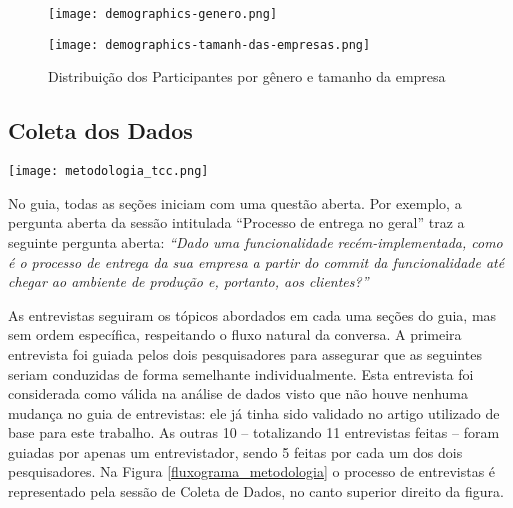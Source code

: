\begin{figure}
\begin{minipage}{.21\textwidth}
    \centering
    \texttt{[image: demographics-genero.png]}
\end{minipage}%
\begin{minipage}{.25\textwidth}
    \centering
    \texttt{[image: demographics-tamanh-das-empresas.png]}
\end{minipage}
\caption{
    Distribuição dos Participantes por gênero e tamanho da empresa
    }
    \label{genero_e_tamanho}
\end{figure}


\subsection{Coleta dos Dados}

\begin{figure*}[ht]
\begin{center}
\texttt{[image: metodologia\_tcc.png]}
\end{center}
\caption[Fluxograma da Metodologia]{
    Visão geral dos processos de coleta e análise de dados.
}\label{fluxograma_metodologia}
\end{figure*}

No guia, todas as seções iniciam com uma questão aberta. Por exemplo, a pergunta aberta da sessão intitulada ``Processo de entrega no geral'' traz a seguinte pergunta aberta: \emph{``Dado uma funcionalidade recém-implementada, como é o processo de entrega da sua empresa a partir do \emph{commit} da funcionalidade até chegar ao ambiente de produção e, portanto, aos clientes?''} 

As entrevistas seguiram os tópicos abordados em cada uma seções do guia, mas sem ordem específica, respeitando o fluxo natural da conversa. A primeira entrevista foi guiada pelos dois pesquisadores para assegurar que as seguintes seriam conduzidas de forma semelhante individualmente. Esta entrevista foi considerada como válida na análise de dados visto que não houve nenhuma mudança no guia de entrevistas: ele já tinha sido validado no artigo utilizado de base para este trabalho. As outras 10 -- totalizando 11 entrevistas feitas -- foram guiadas por apenas um entrevistador, sendo 5 feitas por cada um dos dois pesquisadores. Na Figura \ref{fluxograma_metodologia} o processo de entrevistas é representado pela sessão de Coleta de Dados, no canto superior direito da figura.

